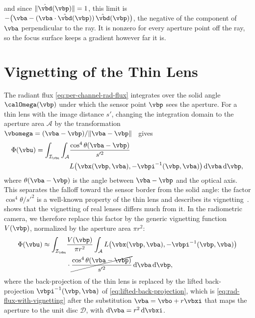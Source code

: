 and since $\lVert\hat{\vbd}(\vbp)\rVert=1$, this limit is
$-\bigl(\vba-(\vba\cdot\hat{\vbd}(\vbp))\,\hat{\vbd}(\vbp)\bigr)$, the
negative of the component of $\vba$ perpendicular to the ray. It is
nonzero for every aperture point off the ray, so the focus surface
keeps a gradient however far it is.


\section{Vignetting of the Thin Lens}
\label{sec:supp-thin-lens-vignetting}
The radiant flux \cref{eq:per-channel-rad-flux} integrates over the
solid angle $\calOmega(\vbp)$ under which the sensor point $\vbp$ sees
the aperture. For a thin lens with the image distance $s'$, changing
the integration domain to the aperture area $\mathcal{A}$ by the
transformation
$\vbomega = (\vba - \vbp)/\lVert \vba - \vbp \rVert$~\cite{pharr2023physically}
gives
\begin{align}
    \Phi(\vbu)\label{eq:rad-flux-disent}
    = \int_{\mathcal{I}_{\vbu}}\int_{\mathcal{A}}&\frac{\cos^4\theta(\vba-\vbp)}{s'^2}\\
    &L\bigl(\vbx(\vbp,\vba),-\vbpi^{-1}(\vbp,\vba)\bigr)\odif{\vba}\odif{\vbp}\nonumber,
\end{align}
where $\theta(\vba-\vbp)$ is the angle between $\vba-\vbp$ and the
optical axis. This separates the falloff toward the sensor border from
the solid angle: the factor $\cos^4\theta/s'^2$ is a well-known
property of the thin lens and describes its
vignetting~\cite{Goossens_2019}.  shows that the
vignetting of real lenses differs much from it. In the radiometric
camera, we therefore replace this factor by the generic vignetting
function $V(\vbp)$, normalized by the aperture area $\pi r^2$:
\begin{align}
    \Phi(\vbu)
    \approx \int_{\mathcal{I}_{\vbu}}&\frac{V(\vbp)}{\pi r^2}
    \int_{\mathcal{A}}L\bigl(\vbx(\vbp,\vba),-\vbpi^{-1}(\vbp,\vba)\bigr)\nonumber\\
    &\cdot\cancel{\frac{\cos^4\theta(\vba-\vbp)}{s'^2}}\odif{\vba}\odif{\vbp},
\end{align}
where the back-projection of the thin lens is replaced by the lifted
back-projection $\vbpi^{-1}(\vbp,\vba)$ of \cref{eq:lifted-back-projection},
which is \cref{eq:rad-flux-with-vignetting} after the substitution
$\vba=\vbo+r\vbxi$ that maps the aperture to the unit disc
$\mathcal{D}$, with $\odif{\vba}=r^2\odif{\vbxi}$.


